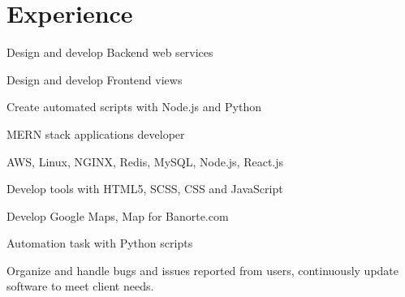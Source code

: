\documentclass[letterpaper]{deedy-resume} %
\begin{document}
\begin{minipage}[t]{0.66\textwidth} %


\section{Experience}


\vspace{\topsep} %
\begin{tightitemize}
\item Design and develop Backend web services
\item Design and develop Frontend views
\item Create automated scripts with Node.js and Python
\item MERN stack applications developer
\item AWS, Linux, NGINX, Redis, MySQL, Node.js, React.js
\end{tightitemize}

\sectionspace %



\begin{tightitemize}
\item Develop tools with HTML5, SCSS, CSS and JavaScript
\item Develop Google Maps, Map for Banorte.com 
\item Automation task with Python scripts
\item Organize and handle bugs and issues reported from users, continuously update software to meet client needs.
\end{tightitemize}

\sectionspace %





\end{minipage}
\end{document}
